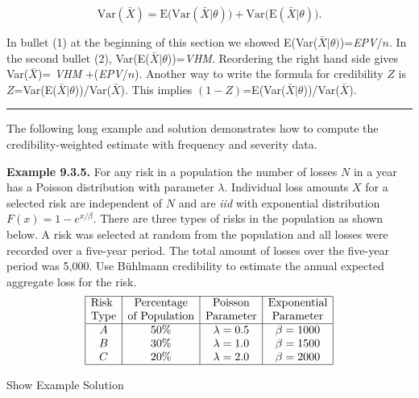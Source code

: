 \documentclass[]{book}
\theoremstyle{definition}
\theoremstyle{definition}
\theoremstyle{definition}
\theoremstyle{remark}
\begin{document}
\begin{equation*} 
\mathrm{Var}(\bar{X})=\textrm{E(Var}(\bar{X}|\theta))+\textrm{Var(E}(\bar{X}|\theta)). 
\end{equation*}

In bullet (1) at the beginning of this section we showed
E(Var(\(\bar{X}|\theta)\))=\emph{EPV}/\(n\). In the second bullet (2),
Var(E(\(\bar{X}|\theta\)))=\emph{VHM}. Reordering the right hand side
gives Var(\(\bar{X}\))= \emph{VHM} +(\emph{EPV}/\(n\)). Another way to
write the formula for credibility \(Z\) is
\(Z\)=Var(E(\(\bar{X}|\theta\)))/Var(\(\bar{X}\)). This implies
\((1-Z)\)=E(Var(\(\bar{X}|\theta\)))/Var(\(\bar{X}\)).

\begin{center}\rule{0.5\linewidth}{\linethickness}\end{center}

The following long example and solution demonstrates how to compute the
credibility-weighted estimate with frequency and severity data.

\textbf{Example 9.3.5.} For any risk in a population the number of
losses \(N\) in a year has a Poisson distribution with parameter
\(\lambda\). Individual loss amounts \(X\) for a selected risk are
independent of \(N\) and are \emph{iid} with exponential distribution
\(F(x)=1-e^{x/\beta}\). There are three types of risks in the population
as shown below. A risk was selected at random from the population and
all losses were recorded over a five-year period. The total amount of
losses over the five-year period was 5,000. Use Bühlmann credibility to
estimate the annual expected aggregate loss for the risk.\\
\[\begin{matrix}
\begin{array}{|c|c|c|c|}
\hline
\text{Risk } & \text{Percentage} & \text{Poisson} & \text{Exponential} \\
\text{Type} & \text{of Population} & \text{Parameter} & \text{Parameter} \\
\hline
A & 50\% & \lambda=0.5 & \beta=1000 \\
B & 30\% & \lambda=1.0 & \beta=1500 \\  
C & 20\% & \lambda=2.0 & \beta=2000 \\              
\hline
\end{array}
\end{matrix}\]

Show Example Solution
\end{document}
